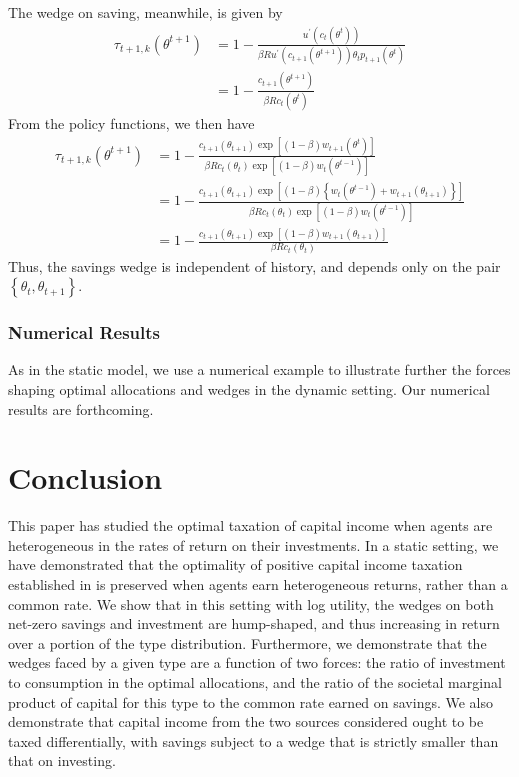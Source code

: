 \documentclass[11pt]{article}
\begin{document}
The wedge on saving, meanwhile, is given by 
\begin{align*}
\tau_{t+1,k}\left(\theta^{t+1}\right) & =1-\frac{u^{\prime}\left(c_{t}\left(\theta^{t}\right)\right)}{\beta Ru^{\prime}\left(c_{t+1}\left(\theta^{t+1}\right)\right)\theta_{t}p_{t+1}\left(\theta^{t}\right)}\\
 & =1-\frac{c_{t+1}\left(\theta^{t+1}\right)}{\beta Rc_{t}\left(\theta^{t}\right)}
\end{align*}
From the policy functions, we then have 
\begin{align}
\tau_{t+1,k}\left(\theta^{t+1}\right) & =1-\frac{c_{t+1}\left(\theta_{t+1}\right)\exp\left[\left(1-\beta\right)w_{t+1}\left(\theta^{t}\right)\right]}{\beta Rc_{t}\left(\theta_{t}\right)\exp\left[\left(1-\beta\right)w_{t}\left(\theta^{t-1}\right)\right]}\nonumber \\
 & =1-\frac{c_{t+1}\left(\theta_{t+1}\right)\exp\left[\left(1-\beta\right)\left\{ w_{t}\left(\theta^{t-1}\right)+w_{t+1}\left(\theta_{t+1}\right)\right\} \right]}{\beta Rc_{t}\left(\theta_{t}\right)\exp\left[\left(1-\beta\right)w_{t}\left(\theta^{t-1}\right)\right]}\nonumber \\
 & =1-\frac{c_{t+1}\left(\theta_{t+1}\right)\exp\left[\left(1-\beta\right)w_{t+1}\left(\theta_{t+1}\right)\right]}{\beta Rc_{t}\left(\theta_{t}\right)}
\end{align}
Thus, the savings wedge is independent of history, and depends only on
the pair $\left\{ \theta_{t},\theta_{t+1}\right\} $. 

\subsubsection{Numerical Results}

As in the static model, we use a numerical example to illustrate further the forces shaping optimal allocations and wedges in the dynamic setting. Our numerical results are forthcoming. 

\section{Conclusion} \label{sec:concl}

This paper has studied the optimal taxation of capital income when agents are heterogeneous in the rates of return on their investments. In a static setting, we have demonstrated that the optimality of positive capital income taxation established in \cite{golosov2003optimal} is preserved when agents earn heterogeneous returns, rather than a common rate. We show that in this setting with log utility, the wedges on both net-zero savings and investment are hump-shaped, and thus increasing in return over a portion of the type distribution. Furthermore, we demonstrate that the wedges faced by a given type are a function of two forces: the ratio of investment to consumption in the optimal allocations, and the ratio of the societal marginal product of capital for this type to the common rate earned on savings. We also demonstrate that capital income from the two sources considered ought to be taxed differentially, with savings subject to a wedge that is strictly smaller than that on investing. 
\end{document}
